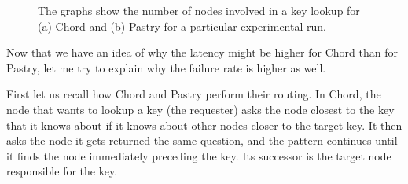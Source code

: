\begin{figure}[!h]
  \centering
  \caption{The graphs show the number of nodes involved in a key lookup for (a) Chord and (b) Pastry for a particular experimental run.}
\end{figure}

\mbox{}
Now that we have an idea of why the latency might be higher for Chord than for Pastry, let me try to explain why the failure rate is higher as well.

First let us recall how Chord and Pastry perform their routing.
In Chord, the node that wants to lookup a key (the requester) asks the node closest to the key that it knows about if it knows about other nodes closer to the target key. It then asks the node it gets returned the same question, and the pattern continues until it finds the node immediately preceding the key. Its successor is the target node responsible for the key.

